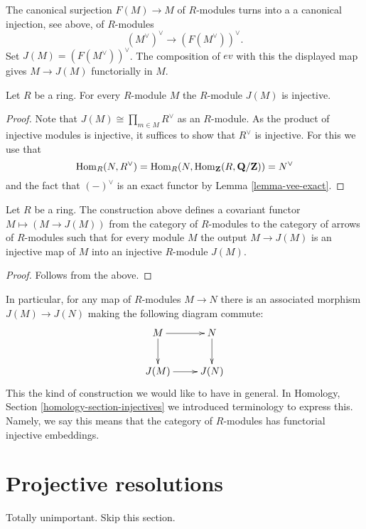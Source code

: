 \noindent
The canonical surjection $F(M) \to M$ of $R$-modules turns into a
a canonical injection, see above, of $R$-modules
$$
(M^\vee)^\vee \longrightarrow (F(M^\vee))^\vee.
$$
Set $J(M) = (F(M^\vee))^\vee$. The composition of $ev$ with this
the displayed map gives $M \to J(M)$ functorially in $M$.

\begin{lemma}
\label{lemma-JM-injective}
Let $R$ be a ring. For every $R$-module $M$ the
$R$-module $J(M)$ is injective.
\end{lemma}

\begin{proof}
Note that $J(M) \cong \prod_{m\in M} R^\vee$ as an $R$-module.
As the product of injective modules is injective, it suffices to
show that $R^\vee$ is injective. For this we use that
$$
\mathop{\rm Hom}\nolimits_R(N, R^\vee) =
\mathop{\rm Hom}\nolimits_R(N, \mathop{\rm Hom}\nolimits_{\mathbf{Z}}(R, \mathbf{Q}/\mathbf{Z})) =
N^\vee
$$
and the
fact that $(-)^\vee$ is an exact functor by Lemma
\ref{lemma-vee-exact}.
\end{proof}

\begin{lemma}
\label{lemma-injectives-modules}
Let $R$ be a ring.
The construction above defines a covariant functor
$M \mapsto (M \to J(M))$ from the category of
$R$-modules to the category of arrows of $R$-modules
such that for every module $M$ the output
$M \to J(M)$ is an injective map of $M$ into
an injective $R$-module $J(M)$.
\end{lemma}

\begin{proof}
Follows from the above.
\end{proof}

\noindent
In particular, for any map of $R$-modules $M \to N$
there is an associated morphism $J(M) \to J(N)$
making the following diagram commute:
$$
\xymatrix{
M \ar[d] \ar[r] & N \ar[d] \\
J(M) \ar[r] & J(N) }
$$
This the kind of construction we would like to have in general.
In Homology, Section \ref{homology-section-injectives}
we introduced terminology to express this. Namely,
we say this means that the category of $R$-modules
has functorial injective embeddings.

\section{Projective resolutions}
\label{section-projective-resolution}

\noindent
Totally unimportant. Skip this section.


